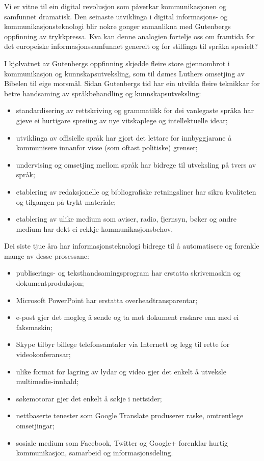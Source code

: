 \begin{multicols}{2}

Vi er vitne til ein digital revolusjon som påverkar kommunikasjonen og samfunnet dramatisk. Den seinaste utviklinga i digital informasjons- og kommunikasjonsteknologi blir nokre gonger samanlikna med Gutenbergs oppfinning av trykkpressa. Kva kan denne analogien fortelje oss om framtida for det europeiske informasjonssamfunnet generelt og for stillinga til språka spesielt? 


I kjølvatnet av Gutenbergs oppfinning skjedde fleire store gjennombrot i kommunikasjon og kunnskapsutveksling, som til dømes Luthers omsetjing av Bibelen til eige morsmål. Sidan Gutenbergs tid har ein utvikla fleire teknikkar for betre handsaming av språkbehandling og kunnskapsutveksling: 

\begin{itemize}
\item standardisering av rettskriving og grammatikk for dei vanlegaste språka har gjeve ei hurtigare spreiing av nye vitskaplege og intellektuelle idear;
\item utviklinga av offisielle språk har gjort det lettare for innbyggjarane å kommunisere innanfor visse (som oftast politiske) grenser; 
\item undervising og omsetjing mellom språk har bidrege til utveksling på tvers av språk; 
\item  etablering av redaksjonelle og bibliografiske retningsliner har sikra kvaliteten og tilgangen på trykt materiale; 
\item etablering av ulike medium som aviser, radio, fjernsyn, bøker og andre medium har dekt ei rekkje kommunikasjonsbehov. 
\end{itemize}

Dei siste tjue åra har informasjonsteknologi bidrege til å automatisere og forenkle mange av desse prosessane: 

\begin{itemize}
\item publiserings- og teksthandsamingsprogram har erstatta skrivemaskin og dokumentproduksjon; 
\item Microsoft PowerPoint har erstatta overheadtransparentar; 
\item e-post gjer det mogleg å sende og ta mot dokument raskare enn med ei faksmaskin; 
\item Skype tilbyr billege telefonsamtaler via Internett og legg til rette for videokonferansar; 
\item ulike format for lagring av lydar og video gjer det enkelt å utveksle multimedie-innhald; 
\item søkemotorar gjer det enkelt å søkje i nettsider; 
\item nettbaserte tenester som Google Translate produserer raske, omtrentlege omsetjingar; 
\item sosiale medium som Facebook, Twitter og Google+ forenklar hurtig kommunikasjon, samarbeid og informasjonsdeling. 
\end{itemize}


\end{multicols}
